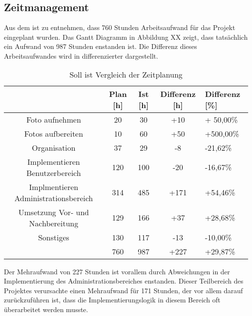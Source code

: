 \subsection{Zeitmanagement}
\label{sec:Zeitmanagement}

Aus dem  ist zu entnehmen, dass 760 Stunden Arbeitsaufwand für das Projekt
eingeplant wurden. Das Gantt Diagramm in Abbildung XX zeigt, dass tatsächlich ein Aufwand von 987 Stunden enstanden ist.
Die Differenz dieses Arbeitsaufwandes wird in  differenzierter dargestellt.

\begin{table}[h]
\centering
\begin{tabular}{ccccl}
\hline
\multicolumn{1}{l}{}                 & Plan {[}h{]} & Ist {[}h{]} & Differenz {[}h{]} & Differenz {[}\%{]} \\ \hline
Foto aufnehmen                       & 20           & 30          & +10               & + 50,00\%          \\ \hline
Fotos aufbereiten                    & 10           & 60          & +50               & +500,00\%          \\ \hline
Organisation                         & 37           & 29          & -8                & -21,62\%           \\ \hline
Implementieren Benutzerbereich       & 120          & 100         & -20               & -16,67\%           \\ \hline
Implmentieren Administrationsbereich & 314          & 485         & +171              & +54,46\%           \\ \hline
Umsetzung Vor- und Nachbereitung     & 129          & 166         & +37               & +28,68\%           \\ \hline
Sonstiges                            & 130          & 117         & -13               & -10,00\%           \\ \hline
                                     & 760          & 987         & +227              & +29,87\%           \\ \hline
\end{tabular}
\caption{Soll ist Vergleich der Zeitplanung}%
\label{tab:SollIstVergleichZeit}%
\end{table}


Der Mehraufwand von 227 Stunden ist vorallem durch Abweichungen in der Implementierung des Administrationsbereiches
enstanden. Dieser Teilbereich des Projektes verursachte einen Mehraufwand für 171 Stunden, der vor allem darauf
zurückzuführen ist, dass die Implementierungslogik in diesem Bereich oft überarbeitet werden musste.

